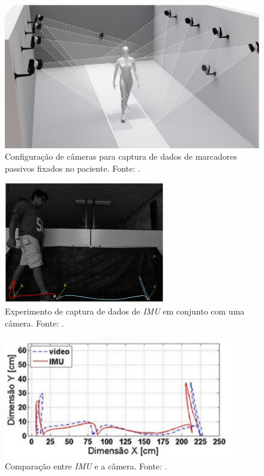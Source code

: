 \begin{figure}[ht]
	\centering
	\includegraphics[width=14cm]{figuras/markers.eps}
	\caption{Configuração de câmeras para captura de dados de marcadores passivos fixados no paciente. Fonte: \cite{Qualisys2013a}.}
	\label{markers}
	
\end{figure}





\begin{figure}[ht]
	\centering
	\includegraphics[width=7cm]{figuras/imu.eps}
	\caption{Experimento de captura de dados de \emph{IMU} em conjunto com uma câmera. Fonte: \cite{Leite2014}.}
	\label{imu}
	
\end{figure}


\begin{figure}[ht]
	\centering
	\includegraphics[width=10cm]{figuras/imu2.eps}
	\caption{Comparação entre \emph{IMU} e a câmera. Fonte: \cite{Leite2014}.}
	\label{imu2}
	
\end{figure}


